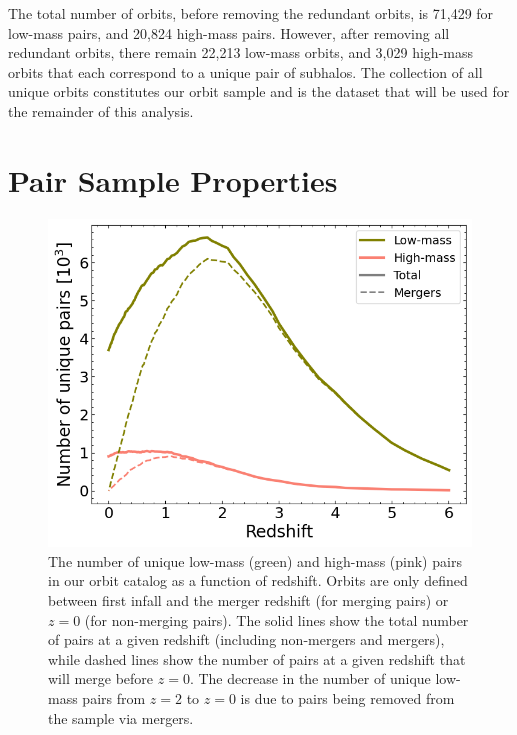 \documentclass[twocolumn,linenumbers]{aastex631}
\begin{document}
The total number of orbits, before removing the redundant orbits,  %
is 71,429 for low-mass pairs, and 20,824 high-mass pairs. 
However, after removing all redundant orbits, there remain 22,213 low-mass orbits, and 3,029 high-mass orbits that each correspond to a unique pair of subhalos. The collection of all unique orbits constitutes our orbit sample and is the dataset that will be used for the remainder of this analysis.


\section{Pair Sample Properties}\label{sec:pairprops}
\begin{figure}[tb]
    \begin{center}
    \includegraphics[width=\columnwidth]{plots/bet-on-it/6_paircount.png}
    \caption{The number of unique low-mass (green) and high-mass (pink) pairs in our orbit catalog as a function of redshift. Orbits are only defined between first infall and the merger redshift (for merging pairs) or $z=0$ (for non-merging pairs). 
    The solid lines show the total number of pairs at a given redshift (including non-mergers and mergers), while dashed lines show the number of pairs at a given redshift that will merge before $z=0$.
    The decrease in the number of unique low-mass pairs from $z=2$ to $z=0$ is due to pairs being removed from the sample via mergers.
    }
    \label{fig:numorbits}
    \end{center}
\end{figure}
\end{document}
